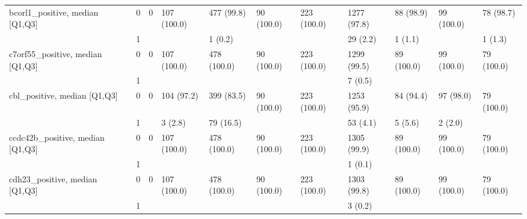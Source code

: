 \begin{tabular}{lllllllllll}
bcorl1\_positive, median [Q1,Q3] & 0 &                    0 &         107 (100.0) &         477 (99.8) &           90 (100.0) &         223 (100.0) &       1277 (97.8) &         88 (98.9) &          99 (100.0) &            78 (98.7) \\
                 & 1 &                      &                     &            1 (0.2) &                      &                     &          29 (2.2) &           1 (1.1) &                     &              1 (1.3) \\
c7orf55\_positive, median [Q1,Q3] & 0 &                    0 &         107 (100.0) &        478 (100.0) &           90 (100.0) &         223 (100.0) &       1299 (99.5) &        89 (100.0) &          99 (100.0) &           79 (100.0) \\
                 & 1 &                      &                     &                    &                      &                     &           7 (0.5) &                   &                     &                      \\
cbl\_positive, median [Q1,Q3] & 0 &                    0 &          104 (97.2) &         399 (83.5) &           90 (100.0) &         223 (100.0) &       1253 (95.9) &         84 (94.4) &           97 (98.0) &           79 (100.0) \\
                 & 1 &                      &             3 (2.8) &          79 (16.5) &                      &                     &          53 (4.1) &           5 (5.6) &             2 (2.0) &                      \\
ccdc42b\_positive, median [Q1,Q3] & 0 &                    0 &         107 (100.0) &        478 (100.0) &           90 (100.0) &         223 (100.0) &       1305 (99.9) &        89 (100.0) &          99 (100.0) &           79 (100.0) \\
                 & 1 &                      &                     &                    &                      &                     &           1 (0.1) &                   &                     &                      \\
cdh23\_positive, median [Q1,Q3] & 0 &                    0 &         107 (100.0) &        478 (100.0) &           90 (100.0) &         223 (100.0) &       1303 (99.8) &        89 (100.0) &          99 (100.0) &           79 (100.0) \\
                 & 1 &                      &                     &                    &                      &                     &           3 (0.2) &                   &                     &                      \\

\end{tabular}
